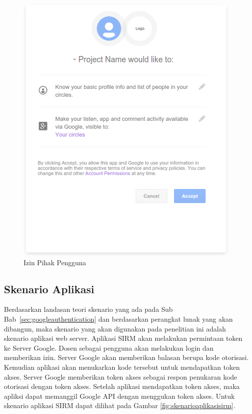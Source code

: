 \begin{figure}[H]
\centering
\includegraphics[scale=0.7]{Gambar/izinpengguna.png}
\caption[Izin Pihak Pengguna]{Izin Pihak Pengguna} 
\label{fig:izinpengguna}
\end{figure}

\subsection{Skenario Aplikasi}
Berdasarkan landasan teori skenario yang ada pada Sub
Bab~\ref{sec:googleauthentication} dan berdasarkan perangkat lunak yang akan
dibangun, maka skenario yang akan digunakan pada penelitian ini adalah skenario
aplikasi web server. Aplikasi SIRM akan melakukan permintaan token ke Server
Google. Dosen sebagai pengguna akan melakukan login dan memberikan izin. Server
Google akan memberikan balasan berupa kode otorisasi. Kemudian aplikasi akan
menukarkan kode tersebut untuk mendapatkan token akses. Server Google memberikan
token akses sebagai respon penukaran kode otorisasi dengan token akses. Setelah
aplikasi mendapatkan token akses, maka apliksi dapat memanggil Google API dengan
menggukan token akses. Untuk skenario aplikasi SIRM dapat dilihat pada Gambar
\ref{fig:skenarioaplikasisirm}.

